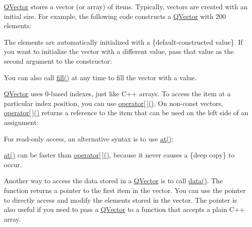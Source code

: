 \begin{DoxyCodeInclude}
\end{DoxyCodeInclude}
 \hyperlink{class_q_vector}{Q\+Vector} stores a vector (or array) of items. Typically, vectors are created with an initial size. For example, the following code constructs a \hyperlink{class_q_vector}{Q\+Vector} with 200 elements\+:


\begin{DoxyCodeInclude}
\end{DoxyCodeInclude}
 The elements are automatically initialized with a \{default-\/constructed value\}. If you want to initialize the vector with a different value, pass that value as the second argument to the constructor\+:


\begin{DoxyCodeInclude}
\end{DoxyCodeInclude}
 You can also call \hyperlink{class_q_vector_aa508b6403bbbe6f81b67d0c9257b7d2b}{fill()} at any time to fill the vector with a value.

\hyperlink{class_q_vector}{Q\+Vector} uses 0-\/based indexes, just like C++ arrays. To access the item at a particular index position, you can use \hyperlink{class_q_vector_a145585285bf96d5fcd8ce10f7bc6ec3e}{operator\mbox{[}$\,$\mbox{]}()}. On non-\/const vectors, \hyperlink{class_q_vector_a145585285bf96d5fcd8ce10f7bc6ec3e}{operator\mbox{[}$\,$\mbox{]}()} returns a reference to the item that can be used on the left side of an assignment\+:


\begin{DoxyCodeInclude}
\end{DoxyCodeInclude}
 For read-\/only access, an alternative syntax is to use \hyperlink{class_q_vector_ab97dbaa9b950ec9c3f3ac51bb602235c}{at()}\+:


\begin{DoxyCodeInclude}
\end{DoxyCodeInclude}
 \hyperlink{class_q_vector_ab97dbaa9b950ec9c3f3ac51bb602235c}{at()} can be faster than \hyperlink{class_q_vector_a145585285bf96d5fcd8ce10f7bc6ec3e}{operator\mbox{[}$\,$\mbox{]}()}, because it never causes a \{deep copy\} to occur.

Another way to access the data stored in a \hyperlink{class_q_vector}{Q\+Vector} is to call \hyperlink{class_q_vector_acc8068ddfe8bc93852558914a5e73b5a}{data()}. The function returns a pointer to the first item in the vector. You can use the pointer to directly access and modify the elements stored in the vector. The pointer is also useful if you need to pass a \hyperlink{class_q_vector}{Q\+Vector} to a function that accepts a plain C++ array.

